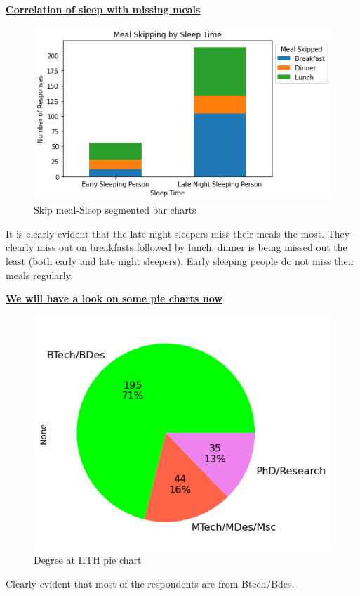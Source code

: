 \documentclass{article}
\begin{document}
\centerline{\underline{\bfseries{Correlation of sleep with missing meals}}}

\begin{figure}[H]
    \centering
    \includegraphics[scale = 0.7]{Meal Skipping - Sleep time Seg chart.png}
    \caption{Skip meal-Sleep segmented bar charts}  
    \label{fig:Normality_plot}
\end{figure}
It is clearly evident that the late night sleepers miss their meals the most. They clearly miss out on breakfasts followed by lunch, dinner is being missed out the least (both early and late night sleepers). Early sleeping people do not miss their meals regularly.

\pagebreak

\centerline{\underline{\bfseries{We will have a look on some pie charts now}}}

\begin{figure}[H]
    \centering
    \includegraphics[scale = 0.9]{pie_degree.png}
    \caption{Degree at IITH pie chart}  
    \label{Normality_plot}
\end{figure}
Clearly evident that most of the respondents are from Btech/Bdes.
\end{document}
